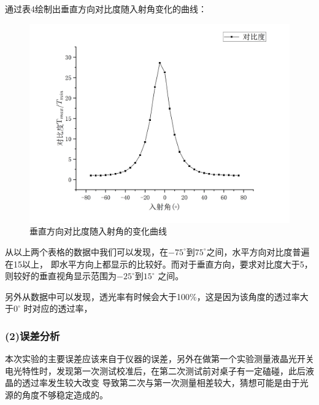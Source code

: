 \documentclass[utf8]{ctexart}
\begin{document}
	通过表4绘制出垂直方向对比度随入射角变化的曲线：
	\begin{figure}[htbp]
		\centering
		\includegraphics[scale=0.45]{6.png}
		\caption{垂直方向对比度随入射角的变化曲线}
	\end{figure}

	从以上两个表格的数据中我们可以发现，在$-75^\circ$到$75^\circ$之间，水平方向对比度普遍在15以上，
	即水平方向上都显示的比较好。而对于垂直方向，要求对比度大于5，则较好的垂直视角显示范围为$-25^\circ$到$15^\circ$
	之间。

	另外从数据中可以发现，透光率有时候会大于100\%，这是因为该角度的透过率大于$0^\circ$
	时对应的透过率，

	\subsubsection*{(2)误差分析}
	本次实验的主要误差应该来自于仪器的误差，另外在做第一个实验测量液晶光开关
	电光特性时，发现第一次测试校准后，在第二次测试前对桌子有一定磕碰，此后液晶的透过率发生较大改变
	导致第二次与第一次测量相差较大，猜想可能是由于光源的角度不够稳定造成的。
	
\end{document}
